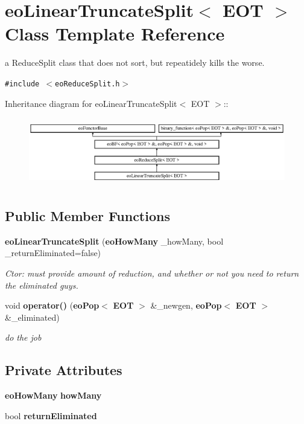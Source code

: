 \section{eo\-Linear\-Truncate\-Split$<$ EOT $>$ Class Template Reference}
\label{classeo_linear_truncate_split}
a Reduce\-Split class that does not sort, but repeatidely kills the worse.  


{\tt \#include $<$eo\-Reduce\-Split.h$>$}

Inheritance diagram for eo\-Linear\-Truncate\-Split$<$ EOT $>$::\begin{figure}[H]
\begin{center}
\leavevmode
\includegraphics[height=3.01075cm]{classeo_linear_truncate_split}
\end{center}
\end{figure}
\subsection*{Public Member Functions}
\begin{CompactItemize}
\item 
{\bf eo\-Linear\-Truncate\-Split} ({\bf eo\-How\-Many} \_\-how\-Many, bool \_\-return\-Eliminated=false)\label{classeo_linear_truncate_split_a0}

\begin{CompactList}\small\item\em Ctor: must provide amount of reduction, and whether or not you need to return the eliminated guys. \item\end{CompactList}\item 
void {\bf operator()} ({\bf eo\-Pop}$<$ {\bf EOT} $>$ \&\_\-newgen, {\bf eo\-Pop}$<$ {\bf EOT} $>$ \&\_\-eliminated)\label{classeo_linear_truncate_split_a1}

\begin{CompactList}\small\item\em do the job \item\end{CompactList}\end{CompactItemize}
\subsection*{Private Attributes}
\begin{CompactItemize}
\item 
{\bf eo\-How\-Many} {\bf how\-Many}\label{classeo_linear_truncate_split_r0}

\item 
bool {\bf return\-Eliminated}\label{classeo_linear_truncate_split_r1}

\end{CompactItemize}


